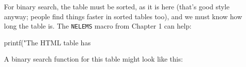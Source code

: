 For binary search, the table must be sorted, as it is here (that's good
style anyway; people find things faster in sorted tables too), and we must
know how long the table is. The \verb'NELEMS' macro from Chapter 1 can
help:
\begin{wellcode}
    printf("The HTML table has %
\end{wellcode}
A binary search function for this table might look like this:
